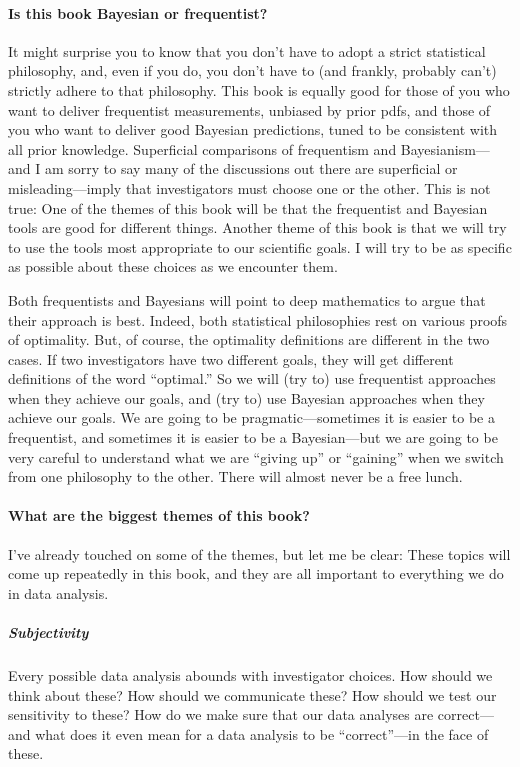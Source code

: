 \paragraph{Is this book Bayesian or frequentist?}
It might surprise you to know that you don't have to adopt a strict statistical philosophy, and, even if you do, you don't have to (and frankly, probably can't) strictly adhere to that philosophy.
This book is equally good for those of you who want to deliver frequentist measurements, unbiased by prior pdfs, and those of you who want to deliver good Bayesian predictions, tuned to be consistent with all prior knowledge.
Superficial comparisons of frequentism and Bayesianism---and I am sorry to say many of the discussions out there are superficial or misleading---imply that investigators must choose one or the other.
This is not true:
One of the themes of this book will be that the frequentist and Bayesian tools are good for different things.
Another theme of this book is that we will try to use the tools most appropriate to our scientific goals.
I will try to be as specific as possible about these choices as we encounter them.

Both frequentists and Bayesians will point to deep mathematics to argue that their approach is best.
Indeed, both statistical philosophies rest on various proofs of optimality.
But, of course, the optimality definitions are different in the two cases.
If two investigators have two different goals, they will get different definitions of the word ``optimal.''
So we will (try to) use frequentist approaches when they achieve our goals, and (try to) use Bayesian approaches when they achieve our goals.
We are going to be pragmatic---sometimes it is easier to be a frequentist, and sometimes it is easier to be a Bayesian---but we are going to be very careful to understand what we are ``giving up'' or ``gaining'' when we switch from one philosophy to the other.
There will almost never be a free lunch.

\paragraph{What are the biggest themes of this book?}
I've already touched on some of the themes, but let me be clear:
These topics will come up repeatedly in this book, and they are all important to everything we do in data analysis.

\subparagraph{Subjectivity}
Every possible data analysis abounds with investigator choices.
How should we think about these?
How should we communicate these?
How should we test our sensitivity to these?
How do we make sure that our data analyses are correct---and what does it even mean for a data analysis to be ``correct''---in the face of these.

